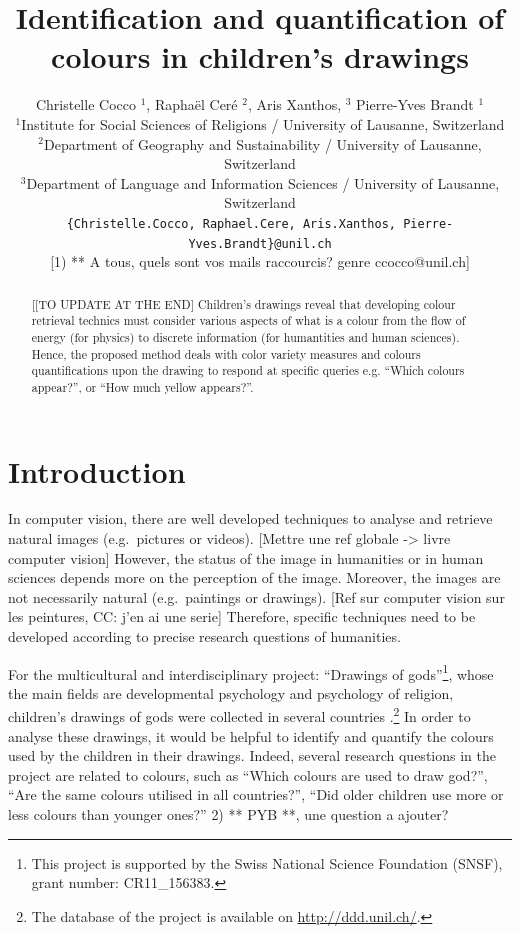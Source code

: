 \documentclass[11pt,a4paper]{article}
\title{Identification and quantification of colours in children's drawings}
\author{Christelle Cocco ${}^1$, Rapha\"el Cer\'e ${}^2$, Aris Xanthos, ${}^3$  Pierre-Yves Brandt ${}^1$\\
  ${}^1$Institute for Social Sciences of Religions / University of Lausanne, Switzerland \\
  ${}^2$Department of Geography and Sustainability / University of Lausanne, Switzerland \\
  ${}^3$Department of Language and Information Sciences / University of Lausanne, Switzerland \\
  {\tt \{Christelle.Cocco, Raphael.Cere, Aris.Xanthos, Pierre-Yves.Brandt\}@unil.ch} \\
  {\color{red} [1) ** A tous, quels sont vos mails raccourcis? genre ccocco@unil.ch]}
  }
\date{}
\begin{document}
\maketitle
\begin{abstract}
{\color{red}[[TO UPDATE AT THE END]}
{\color{gray}Children's drawings reveal that developing colour retrieval technics
must consider various aspects of what is a colour from the flow of
energy (for physics) to discrete information (for humantities and human
sciences). Hence, the proposed method deals with color variety measures
and colours quantifications upon the drawing to respond at specific
queries e.g. ``Which colours appear?'', or ``How much yellow appears?''.}
\end{abstract}


\section{Introduction}\label{introduction}
\label{sec:introduction}

In computer vision, there are well developed techniques to analyse and retrieve natural images (e.g.~pictures or videos). {\color{red} [Mettre une ref globale -> livre computer vision]}
However, the status of the image in humanities or in human sciences depends more on the perception of the image. Moreover, the images are not necessarily natural (e.g.~paintings or drawings). {\color{red} [Ref sur computer vision sur les peintures, CC: j'en ai une serie]} Therefore, specific techniques need to be developed according to precise research questions of humanities.

For the multicultural and interdisciplinary project: ``Drawings of gods''\footnote{This project is supported by the Swiss National Science Foundation (SNSF), grant number: CR11\_156383.}, whose the main fields are developmental psychology and psychology of religion, children's drawings of gods were collected in several countries \cite[for more details about this project, see \textit{e.g.}][]{BrandtKagataSpittelerGillieronPaleologue2009,Dandarova2013,DandarovaRobertDessartSerbaevaEtAl2016}.\footnote{The database of the project is available on \url{http://ddd.unil.ch/}.} 
In order to analyse these drawings, it would be helpful to identify and quantify the colours used by the children in their drawings. 
Indeed, several research questions in the project are related to colours, such as ``Which colours are used to draw god?'', ``Are the same colours utilised in all countries?'', ``Did older children use more or less colours than younger ones?'' {\color{red} 2) ** PYB **, une question a ajouter?}
\end{document}

